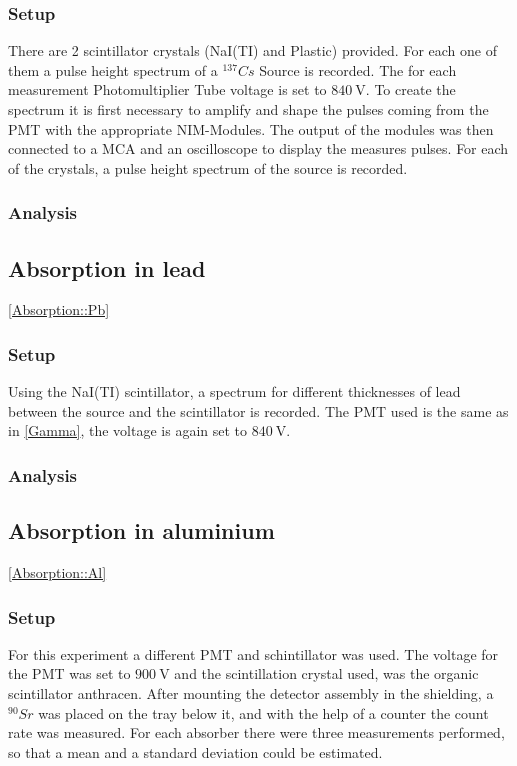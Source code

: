 \documentclass[12pt,twoside,a4paper]{scrartcl}
\begin{document}
		\subsubsection{Setup}

		There are 2 scintillator crystals (NaI(TI) and Plastic) provided. For each one of them a pulse height spectrum of a $^{137}Cs$ Source is recorded. The for each measurement Photomultiplier Tube voltage is set to $\SI{840}{\volt}$. To create the spectrum it is first necessary to amplify and shape the pulses coming from the PMT with the appropriate NIM-Modules. The output of the modules was then connected to a MCA and an oscilloscope to display the measures pulses. For each of the crystals, a pulse height spectrum of the source is recorded.

		\subsubsection{Analysis}


	\subsection{Absorption in lead}
	\ref{Absorption::Pb}
		\subsubsection{Setup}
			Using the NaI(TI) scintillator, a spectrum for different thicknesses of lead between the source and the scintillator is recorded. The PMT used is the same as in \ref{Gamma}, the voltage is again set to $\SI{840}{\volt}$.

		\subsubsection{Analysis}


	\subsection{Absorption in aluminium}
	\ref{Absorption::Al}
		\subsubsection{Setup}
				For this experiment a different PMT and schintillator was used. The voltage for the PMT was set to $\SI{900}{\volt}$ and the scintillation crystal used, was the organic scintillator anthracen. After mounting the detector assembly in the shielding, a $^{90}Sr$ was placed on the tray below it, and with the help of a counter the count rate was measured. For each absorber there were three measurements performed, so that a mean and a standard deviation could be estimated.
\end{document}
